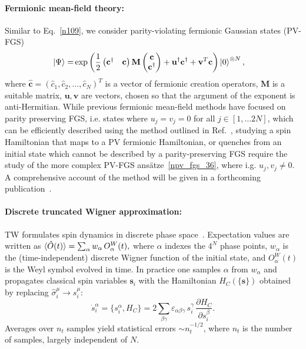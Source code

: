 \documentclass[aps,pra,reprint,amssymb,superscriptaddress]{revtex4-2}
\begin{document}
\paragraph{Fermionic mean-field theory:}
Similar to Eq.~\eqref{n109}, we consider parity-violating fermionic Gaussian states (PV-FGS)~\cite{seifi_mirjafarlou_generalization_2024}
\begin{align}
    \ket{\Psi}  =& \exp\left( \frac{1}{2} \begin{pmatrix} \mathbf c^\dag & \mathbf c \end{pmatrix} \mathbf M \begin{pmatrix}
        \mathbf c \\ \mathbf c^\dag
    \end{pmatrix} +\mathbf u^\dag \mathbf c^\dag +\mathbf v^T\mathbf c \right)\ket{0}^{\otimes N},\label{npv_fgs_36}
\end{align}
where $\hat{\mathbf c}=(\hat c_1,\hat c_2,\dots,\hat c_{N})^T$ is a vector of fermionic creation operators, $\mathbf M$ is a suitable matrix, $\mathbf u, \mathbf v$ are vectors, chosen so that the argument of the exponent is anti-Hermitian. 
While previous fermionic mean-field methods have focused on parity preserving FGS, i.e. states where $u_j=v_j=0$ for all $j\in [1,
\dots 2N]$, which can be efficiently described using the method outlined in Ref.~\cite{shi_variational_2018}, studying a spin Hamiltonian that maps to a PV fermionic Hamiltonian, or quenches from an initial state which cannot be described by a parity-preserving FGS require the study of the more complex PV-FGS ansätze~\eqref{npv_fgs_36}, where i.g. $u_j,v_j\neq 0$. A comprehensive account of the method will be given in a forthcoming publication~\cite{KaicherInPrep}.

\paragraph{Discrete truncated Wigner approximation:}
TW formulates spin dynamics in discrete phase space~\cite{schachenmayer_many-body_2015}.
Expectation values are written as
\(
\braket{\hat O(t)}=\sum_{\alpha} w_\alpha\, O^W_\alpha(t),
\)
where \(\alpha\) indexes the \(4^N\) phase points, \(w_\alpha\) is the (time-independent) discrete Wigner function of the initial state, and \(O^W_\alpha(t)\) is the Weyl symbol evolved in time. In practice one samples \(\alpha\) from \(w_\alpha\) and propagates classical spin variables \(\mathbf s_i\) with the Hamiltonian \(H_C(\{\mathbf s\})\) obtained by replacing \(\hat\sigma_i^\mu\!\to s_i^\mu\):
\begin{equation}
\dot s_i^\alpha
= \{s_i^\alpha,H_C\}
= 2\sum_{\beta\gamma}\varepsilon_{\alpha\beta\gamma}\, s_i^\gamma\,\frac{\partial H_C}{\partial s_i^\beta}.
\label{eomcl_short}
\end{equation}
Averages over \(n_t\) samples yield statistical errors \(\sim n_t^{-1/2}\), where $n_t$ is the number of samples, largely independent of \(N\). 
\end{document}
